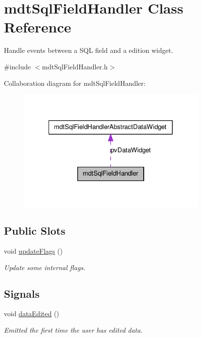 \hypertarget{classmdt_sql_field_handler}{
\section{mdtSqlFieldHandler Class Reference}
\label{classmdt_sql_field_handler}
}


Handle events between a SQL field and a edition widget.  




{\ttfamily \#include $<$mdtSqlFieldHandler.h$>$}



Collaboration diagram for mdtSqlFieldHandler:
\nopagebreak
\begin{figure}[H]
\begin{center}
\leavevmode
\includegraphics[width=270pt]{classmdt_sql_field_handler__coll__graph}
\end{center}
\end{figure}
\subsection*{Public Slots}
\begin{DoxyCompactItemize}
\item 
void \hyperlink{classmdt_sql_field_handler_a7bb4e75ab209bdd2609cf458b5ce8868}{updateFlags} ()
\begin{DoxyCompactList}\small\item\em Update some internal flags. \end{DoxyCompactList}\end{DoxyCompactItemize}
\subsection*{Signals}
\begin{DoxyCompactItemize}
\item 
\hypertarget{classmdt_sql_field_handler_a111eebc8905151a5938950e23e61ff90}{
void \hyperlink{classmdt_sql_field_handler_a111eebc8905151a5938950e23e61ff90}{dataEdited} ()}
\label{classmdt_sql_field_handler_a111eebc8905151a5938950e23e61ff90}

\begin{DoxyCompactList}\small\item\em Emitted the first time the user has edited data. \end{DoxyCompactList}\end{DoxyCompactItemize}
